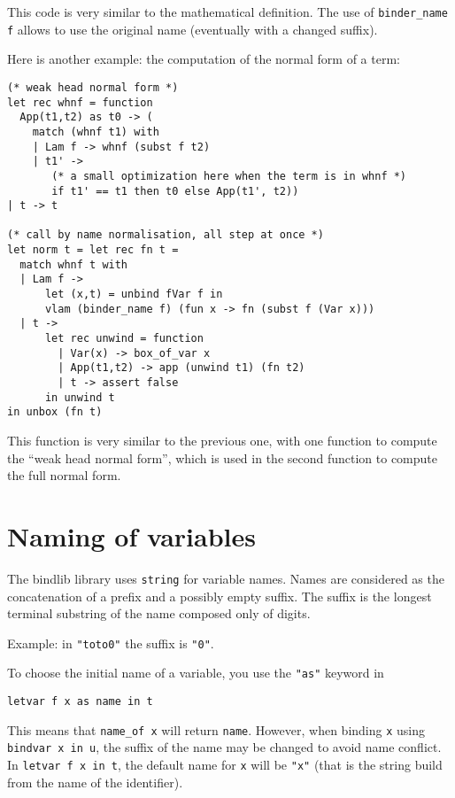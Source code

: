 \documentclass[11pt]{article}
\begin{document}
This code is very similar to the mathematical definition.
The use of \verb#binder_name f# allows to use the original name
(eventually with a changed suffix).

Here is another example: the computation of the normal form of a term:

\begin{verbatim}
(* weak head normal form *)
let rec whnf = function
  App(t1,t2) as t0 -> (
    match (whnf t1) with
    | Lam f -> whnf (subst f t2)
    | t1' ->
       (* a small optimization here when the term is in whnf *)
       if t1' == t1 then t0 else App(t1', t2))
| t -> t

(* call by name normalisation, all step at once *)
let norm t = let rec fn t =
  match whnf t with
  | Lam f ->
      let (x,t) = unbind fVar f in
      vlam (binder_name f) (fun x -> fn (subst f (Var x)))
  | t ->
      let rec unwind = function
        | Var(x) -> box_of_var x
        | App(t1,t2) -> app (unwind t1) (fn t2)
        | t -> assert false
      in unwind t
in unbox (fn t)
\end{verbatim}

This function is very similar to the previous one, with one function
to compute the ``weak head normal form'', which is used in the second
function to compute the full normal form.

\section{Naming of variables}

The bindlib library uses \verb#string# for variable names. Names are
considered
as the concatenation of a prefix and a possibly empty suffix. The
suffix is the longest terminal substring of the name composed only of
digits.

Example: in \verb#"toto0"# the suffix is \verb#"0"#.

To choose the initial name of a variable, you use the \verb#"as"#
keyword in

\begin{verbatim}
letvar f x as name in t
\end{verbatim}

This means that \verb#name_of x# will return \verb#name#. However,
when binding \verb#x# using \verb#bindvar x in u#, the suffix of
the name may be changed to avoid name conflict. In
\verb#letvar f x in t#, the default name for \verb#x# will be
\verb#"x"# (that is the string build from the name of the identifier).
\end{document}
